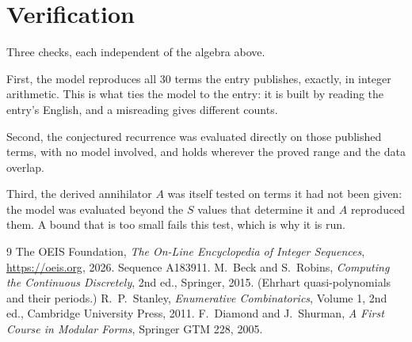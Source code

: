 \documentclass[11pt,a4paper]{article}
\theoremstyle{plain}
\theoremstyle{definition}
\begin{document}
\section{Verification}

Three checks, each independent of the algebra above.

First, the model reproduces all $30$ terms the entry publishes, exactly, in integer
arithmetic. This is what ties the model to the entry: it is built by reading the entry's
English, and a misreading gives different counts.

Second, the conjectured recurrence was evaluated directly on those published terms, with no
model involved, and holds wherever the proved range and the data overlap.

Third, the derived annihilator $A$ was itself tested on terms it had not been given: the model
was evaluated beyond the $S$ values that determine it and $A$ reproduced them. A bound that is
too small fails this test, which is why it is run.

\begin{thebibliography}{9}
 The OEIS Foundation, \emph{The On-Line Encyclopedia of Integer
Sequences}, \url{https://oeis.org}, 2026. Sequence A183911.
 M.~Beck and S.~Robins, \emph{Computing the Continuous Discretely},
2nd ed., Springer, 2015. (Ehrhart quasi-polynomials and their periods.)
 R.~P.~Stanley, \emph{Enumerative Combinatorics}, Volume 1, 2nd ed.,
Cambridge University Press, 2011.
 F.~Diamond and J.~Shurman, \emph{A First Course in Modular Forms},
Springer GTM 228, 2005.
\end{thebibliography}
\end{document}
